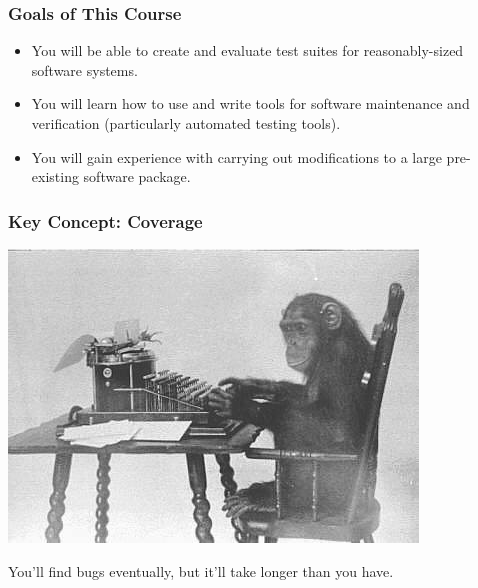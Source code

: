 \documentclass{beamer}
\newenvironment{changemargin}[1]{%
  \begin{list}{}{%
    \setlength{\topsep}{0pt}%
    \setlength{\leftmargin}{#1}%
    \setlength{\rightmargin}{1em}
    \setlength{\listparindent}{\parindent}%
    \setlength{\itemindent}{\parindent}%
    \setlength{\parsep}{\parskip}%
  }%
  \item[]}{\end{list}}
\begin{document}
\begin{frame}

  \frametitle{Goals of This Course}

    \begin{changemargin}{2em}

  \begin{itemize}

  \item You will be able to create and evaluate test suites for reasonably-sized
software systems.\\[1em]

  \item You will learn how to use and write tools for software maintenance and
verification (particularly automated testing tools).\\[1em]

  \item You will gain experience with carrying out modifications
to a large pre-existing software package.

  \end{itemize}
    \end{changemargin}

\end{frame}


\begin{frame}

  \frametitle{Key Concept: Coverage}

\begin{center}
\includegraphics[height=.4\textheight]{L01/Monkey-typing.jpg}
\end{center}

  \begin{changemargin}{2em}
    You'll find bugs eventually, but it'll take longer than you have.
  \end{changemargin}

\end{frame}
\end{document}
